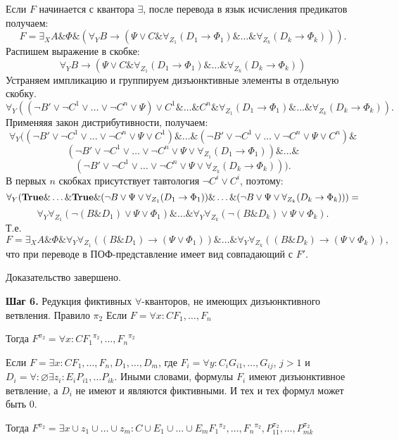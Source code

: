 \documentclass[a4paper]{jctart15b}
\begin{document}
Если $F$ начинается с квантора $\exists$, после перевода в язык исчисления предикатов получаем:
$$F = \exists_X A\&\Phi\&(\forall_Y B\rightarrow (\Psi\vee C\&\forall_{Z_1}(D_1\rightarrow\Phi_1)\&\ldots\&\forall_{Z_k}(D_k\rightarrow\Phi_k))).$$
Распишем выражение в скобке:
$$\forall_Y B\rightarrow (\Psi\vee C\&\forall_{Z_1}(D_1\rightarrow\Phi_1)\&\ldots\&\forall_{Z_k}(D_k\rightarrow\Phi_k))$$
Устраняем импликацию и группируем дизъюнктивные элементы в отдельную скобку.
$$\forall_Y ((\neg B'\vee\neg C^1\vee\ldots\vee\neg C^n\vee\Psi) \vee C^1\&\ldots\& C^n\&\forall_{Z_1}(D_1\rightarrow\Phi_1)\&\ldots\&\forall_{Z_k}(D_k\rightarrow\Phi_k)).$$
Применяяя закон дистрибутивности, получаем:
$$\forall_Y ((\neg B'\vee\neg C^1\vee\ldots\vee\neg C^n\vee\Psi\vee C^1)\&\ldots\&(\neg B'\vee\neg C^1\vee\ldots\vee\neg C^n\vee\Psi\vee C^n)\&$$
$$(\neg B'\vee\neg C^1\vee\ldots\vee\neg C^n\vee\Psi\vee\forall_{Z_1}(D_1\rightarrow\Phi_1) )\&\ldots\&$$
$$(\neg B'\vee\neg C^1\vee\ldots\vee\neg C^n\vee\Psi\vee\forall_{Z_k}(D_k\rightarrow\Phi_k) )).$$
В первых $n$ скобках присутствует тавтология $\neg C^i\vee C^i$, поэтому:
$$\forall_Y (\text{\textbf{True}}\&\ldots\&\text{\textbf{True}}\&(\neg B\vee\Psi\vee\forall_{Z_1}(D_1\rightarrow\Phi_1) )\&\ldots\&(\neg B\vee\Psi\vee\forall_{Z_k}(D_k\rightarrow\Phi_k) )) = $$
$$\forall_Y\forall_{Z_1}(\neg(B\& D_1)\vee\Psi\vee\Phi_1)\&\ldots\&\forall_Y\forall_{Z_k}(\neg(B\& D_k)\vee\Psi\vee\Phi_k).$$
Т.е. $$F = \exists_X A\&\Phi\&\forall_Y\forall_{Z_1}((B\& D_1)\rightarrow(\Psi\vee\Phi_1))\&\ldots\&\forall_Y\forall_{Z_k}((B\& D_k)\rightarrow(\Psi\vee\Phi_k)),$$
что при переводе в ПОФ-представление имеет вид совпадающий с $F'$.

Доказательство завершено.


\textbf{Шаг 6.} Редукция фиктивных $\forall$-кванторов, не имеющих дизъюнктивного ветвления. Правило $\pi_2$
Если 
$F = \forall{x}\colon C F_1,\ldots,F_n$

Тогда
$F^{\pi_2} = \forall{x}\colon C {F_1}^{\pi_2},\ldots,{F_n}^{\pi_2}$

Если
$F = \exists{x}\colon C F_1,\ldots,F_n, D_1,\ldots,D_m$, где $F_i = \forall{y}\colon C_i G_{i1},\ldots,G_{ij}$, $j > 1$ и $D_i = \forall\colon\varnothing\exists{z_i}\colon E_i P_{i1},\ldots P_{ik}$. Иными словами, формулы  $F_i$ имеют дизъюнктивное ветвление, а $D_i$ не имеют и являются фиктивными. И тех и тех формул может быть $0$. 

Тогда
$F^{\pi_2} = \exists{x \cup z_1 \cup\ldots\cup z_m}\colon {C \cup E_1 \cup\ldots\cup E_m} {F_1}^{\pi_2},\ldots,{F_n}^{\pi_2},P_{11}^{\pi_2},\ldots,P_{mk}^{\pi_2}$
\end{document}

